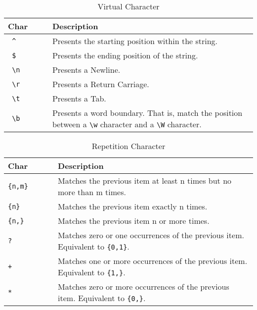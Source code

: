 \documentclass{article}
\begin{document}
\begin{table}[ht]
\caption{Virtual Character}
\centering
\begin{tabular}{l p{8cm} }
\hline\hline
Char & Description \\[0.5ex]
\hline
\verb/ ^           / & Presents the starting position within the string. \\
\verb/ $ / & Presents the ending position of the string.\\
\verb/ \n / & Presents a Newline. \\
\verb/ \r / & Presents a Return Carriage. \\
\verb/ \t / & Presents a Tab. \\
\verb/ \b / & Presents a word boundary. That is, match the position between a \verb/\w/ character and a \verb/\W/ character.\\
\hline
\end{tabular}
\label{table:vc}
\end{table}

\begin{table}[ht]
\caption{Repetition Character}
\centering
\begin{tabular}{l p{8cm}}
\hline\hline
Char & Description \\[0.5ex]
\hline
\verb/{n,m}        / & Matches the previous item at least n times but no more than m times.\\
\verb/{n}/ & Matches the previous item exactly n times.\\
\verb/{n,}/ & Matches the previous item n or more times.\\
\verb/?/ & Matches zero or one occurrences of the previous item. Equivalent to \verb/{0,1}/. \\
\verb/+/ & Matches one or more occurrences of the previous item. Equivalent to \verb/{1,}/.\\
\verb/*/ & Matches zero or more occurrences of the previous item. Equivalent to \verb/{0,}/.\\

\hline
\end{tabular}
\label{table:rc}
\end{table}
\end{document}
